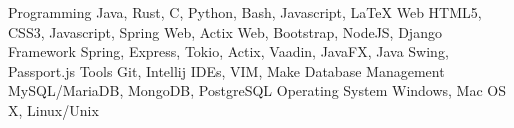 \begin{cvskills}
	\cvskill
	  {Programming}
	  {Java, Rust, C, Python, Bash, Javascript, LaTeX}
	\cvskill
	  {Web}
	  {HTML5, CSS3, Javascript, Spring Web, Actix Web, Bootstrap, NodeJS, Django}
	\cvskill
	  {Framework}
	  {Spring, Express, Tokio, Actix, Vaadin, JavaFX, Java Swing, Passport.js}
	\cvskill
	  {Tools}
	  {Git, Intellij IDEs, VIM, Make}
	\cvskill
	  {Database Management}
	  {MySQL/MariaDB, MongoDB, PostgreSQL}
	\cvskill
	  {Operating System}
	  {Windows, Mac OS X, Linux/Unix}
\end{cvskills}

